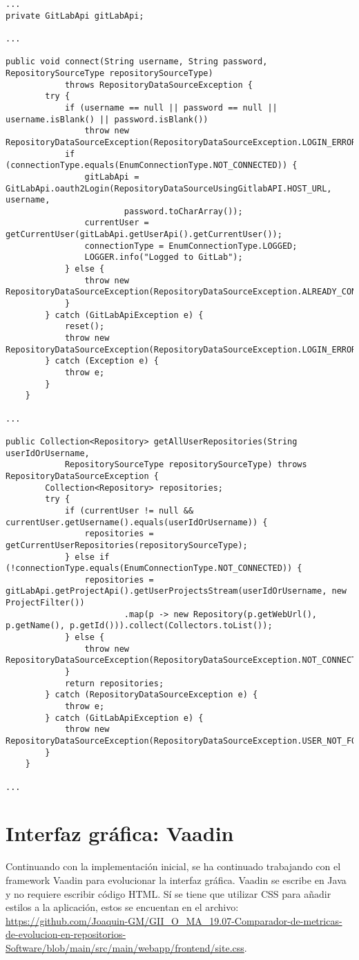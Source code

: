 \begin{minipage}{\linewidth}
{\tiny
\begin{verbatim}
...
private GitLabApi gitLabApi;

...

public void connect(String username, String password, RepositorySourceType repositorySourceType)
			throws RepositoryDataSourceException {
		try {
			if (username == null || password == null || username.isBlank() || password.isBlank())
				throw new RepositoryDataSourceException(RepositoryDataSourceException.LOGIN_ERROR);
			if (connectionType.equals(EnumConnectionType.NOT_CONNECTED)) {
				gitLabApi = GitLabApi.oauth2Login(RepositoryDataSourceUsingGitlabAPI.HOST_URL, username,
						password.toCharArray());
				currentUser = getCurrentUser(gitLabApi.getUserApi().getCurrentUser());
				connectionType = EnumConnectionType.LOGGED;
				LOGGER.info("Logged to GitLab");
			} else {
				throw new RepositoryDataSourceException(RepositoryDataSourceException.ALREADY_CONNECTED);
			}
		} catch (GitLabApiException e) {
			reset();
			throw new RepositoryDataSourceException(RepositoryDataSourceException.LOGIN_ERROR);
		} catch (Exception e) {
			throw e;
		}
	}

...

public Collection<Repository> getAllUserRepositories(String userIdOrUsername,
			RepositorySourceType repositorySourceType) throws RepositoryDataSourceException {
		Collection<Repository> repositories;
		try {
			if (currentUser != null && currentUser.getUsername().equals(userIdOrUsername)) {
				repositories = getCurrentUserRepositories(repositorySourceType);
			} else if (!connectionType.equals(EnumConnectionType.NOT_CONNECTED)) {
				repositories = gitLabApi.getProjectApi().getUserProjectsStream(userIdOrUsername, new ProjectFilter())
						.map(p -> new Repository(p.getWebUrl(), p.getName(), p.getId())).collect(Collectors.toList());
			} else {
				throw new RepositoryDataSourceException(RepositoryDataSourceException.NOT_CONNECTED);
			}
			return repositories;
		} catch (RepositoryDataSourceException e) {
			throw e;
		} catch (GitLabApiException e) {
			throw new RepositoryDataSourceException(RepositoryDataSourceException.USER_NOT_FOUND);
		}
	}
	
...
\end{verbatim}
}
\end{minipage}

\newpage
\section{Interfaz gráfica: Vaadin}
Continuando con la implementación inicial, se ha continuado trabajando con el framework Vaadin para evolucionar la interfaz gráfica. Vaadin se escribe en Java y no requiere escribir código HTML. Sí se tiene que utilizar CSS para añadir estilos a la aplicación, estos se encuentan en el archivo: 
\url{https://github.com/Joaquin-GM/GII_O_MA_19.07-Comparador-de-metricas-de-evolucion-en-repositorios-Software/blob/main/src/main/webapp/frontend/site.css}.

